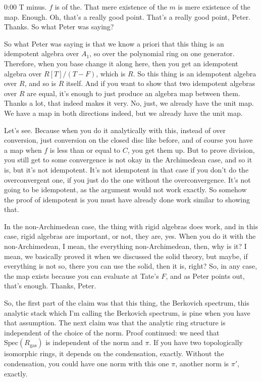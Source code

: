 \begin{unfinished}{0:00}
T minus. $f$ is of the. That mere existence of the $m$ is mere existence of the map. Enough. Oh, that's a really good point. That's a really good point, Peter. Thanks. So what Peter was saying?

So what Peter was saying is that we know a priori that this thing is an idempotent algebra over $A_1$, so over the polynomial ring on one generator. Therefore, when you base change it along here, then you get an idempotent algebra over $R[T]/(T-F)$, which is $R$. So this thing is an idempotent algebra over $R$, and so is $R$ itself. And if you want to show that two idempotent algebras over $R$ are equal, it's enough to just produce an algebra map between them. Thanks a lot, that indeed makes it very. No, just, we already have the unit map. We have a map in both directions indeed, but we already have the unit map.

Let's see. Because when you do it analytically with this, instead of over conversion, just conversion on the closed disc like before, and of course you have a map when $f$ is less than or equal to $C$, you get them up. But to prove division, you still get to some convergence is not okay in the Archimedean case, and so it is, but it's not idempotent. It's not idempotent in that case if you don't do the overconvergent one, if you just do the one without the overconvergence. It's not going to be idempotent, as the argument would not work exactly. So somehow the proof of idempotent is you must have already done work similar to showing that.

In the non-Archimedean case, the thing with rigid algebras does work, and in this case, rigid algebras are important, or not, they are, yes. When you do it with the non-Archimedean, I mean, the everything non-Archimedean, then, why is it? I mean, we basically proved it when we discussed the solid theory, but maybe, if everything is not so, there you can use the solid, then it is, right? So, in any case, the map exists because you can evaluate at Tate's $F$, and as Peter points out, that's enough. Thanks, Peter.

So, the first part of the claim was that this thing, the Berkovich spectrum, this analytic stack which I'm calling the Berkovich spectrum, is pine when you have that assumption. The next claim was that the analytic ring structure is independent of the choice of the norm. Proof continued: we need that $\text{Spec}(R_{\text{gas}})$ is independent of the norm and $\pi$. If you have two topologically isomorphic rings, it depends on the condensation, exactly. Without the condensation, you could have one norm with this one $\pi$, another norm is $\pi'$, exactly.


\end{unfinished}
